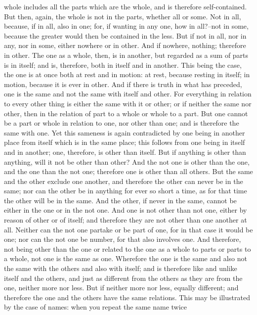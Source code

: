 whole includes all the parts which are the whole, and is therefore
self-contained. But then, again, the whole is not in the parts, whether
all or some. Not in all, because, if in all, also in one; for, if
wanting in any one, how in all?--not in some, because the greater would
then be contained in the less. But if not in all, nor in any, nor in
some, either nowhere or in other. And if nowhere, nothing; therefore in
other. The one as a whole, then, is in another, but regarded as a sum
of parts is in itself; and is, therefore, both in itself and in another.
This being the case, the one is at once both at rest and in motion: at
rest, because resting in itself; in motion, because it is ever in other.
And if there is truth in what has preceded, one is the same and not the
same with itself and other. For everything in relation to every other
thing is either the same with it or other; or if neither the same nor
other, then in the relation of part to a whole or whole to a part. But
one cannot be a part or whole in relation to one, nor other than
one; and is therefore the same with one. Yet this sameness is again
contradicted by one being in another place from itself which is in the
same place; this follows from one being in itself and in another; one,
therefore, is other than itself. But if anything is other than anything,
will it not be other than other? And the not one is other than the one,
and the one than the not one; therefore one is other than all others.
But the same and the other exclude one another, and therefore the other
can never be in the same; nor can the other be in anything for ever so
short a time, as for that time the other will be in the same. And the
other, if never in the same, cannot be either in the one or in the not
one. And one is not other than not one, either by reason of other or
of itself; and therefore they are not other than one another at all.
Neither can the not one partake or be part of one, for in that case it
would be one; nor can the not one be number, for that also involves one.
And therefore, not being other than the one or related to the one as
a whole to parts or parts to a whole, not one is the same as one.
Wherefore the one is the same and also not the same with the others
and also with itself; and is therefore like and unlike itself and the
others, and just as different from the others as they are from the one,
neither more nor less. But if neither more nor less, equally different;
and therefore the one and the others have the same relations. This may
be illustrated by the case of names: when you repeat the same name twice
